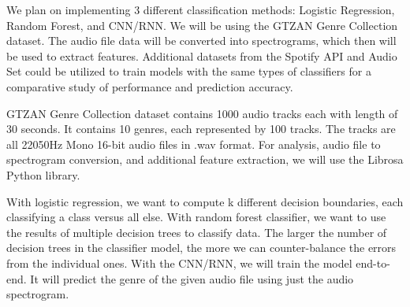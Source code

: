 \documentclass[12pt]{article}
\begin{document}
We plan on implementing 3 different classification methods: Logistic Regression, Random Forest, and CNN/RNN. We will be using the GTZAN Genre Collection dataset. The audio file data will be converted into spectrograms, which then will be used to extract features. Additional datasets from the Spotify API and Audio Set could be utilized to train models with the same types of classifiers for a comparative study of performance and prediction accuracy. 

GTZAN Genre Collection dataset contains 1000 audio tracks each with length of 30 seconds. It contains 10 genres, each represented by 100 tracks. The tracks are all 22050Hz Mono 16-bit audio files in .wav format. For analysis, audio file to spectrogram conversion, and additional feature extraction, we will use the Librosa Python library. 

With logistic regression, we want to compute k different decision boundaries, each classifying a class versus all else. With random forest classifier, we want to use the results of multiple decision trees to classify data. The larger the number of decision trees in the classifier model, the more we can counter-balance the errors from the individual ones. With the CNN/RNN, we will train the model end-to-end. It will predict the genre of the given audio file using just the audio spectrogram. 
\end{document}
